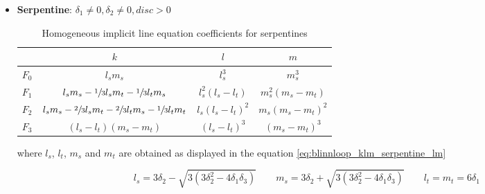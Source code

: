 \documentclass[\topdir/main.tex]{subfiles}
\begin{document}
\begin{itemize}
    \item \textbf{Serpentine}: $\delta_1 \neq 0, \delta_2 \neq 0, disc > 0$
        \begin{table}[H]
            \centering
            \begin{tabular}{|l|c|c|c|}
                \hline
                \qquad&     $k$ &               $l$ &               $m$ \\\hline
                $F_0$ &     $l_s m_s$ &         $l_s^3$ &           $m_s^3$ \\\hline
                $F_1$ &     $l_s m_s - \sfrac{1}{3} l_s m_t - \sfrac{1}{3} l_t m_s$ &       
                            $l_s^2 (l_s - l_t)$ &         
                            $m_s^2 (m_s - m_t)$ \\\hline
                $F_2$ &     $l_s m_s - \sfrac{2}{3} l_s m_t - \sfrac{2}{3} l_t m_s - \sfrac{1}{3} l_t m_t$ &
                            $l_s (l_s - l_t)^2$ &
                            $m_s (m_s - m_t)^2$ \\\hline
                $F_3$ &     $(l_s - l_t) (m_s - m_t)$ &  
                            $(l_s - l_t)^3$ &  
                            $(m_s - m_t)^3$ \\\hline
            \end{tabular}
            \caption{Homogeneous implicit line equation coefficients for serpentines}
            \label{tab:blinnloop_klm_serpentine}
        \end{table}
        
        where $l_s$, $l_t$, $m_s$ and $m_t$ are obtained as displayed in the equation \eqref{eq:blinnloop_klm_serpentine_lm}
        
        \begin{equation} \label{eq:blinnloop_klm_serpentine_lm}
            l_s = 3\delta_2 - \sqrt{3(3\delta_2^2 - 4\delta_1\delta_3)} \qquad
            m_s = 3\delta_2 + \sqrt{3(3\delta_2^2 - 4\delta_1\delta_3)} \qquad
            l_t = m_t = 6 \delta_1
        \end{equation}


\end{itemize}
\end{document}
